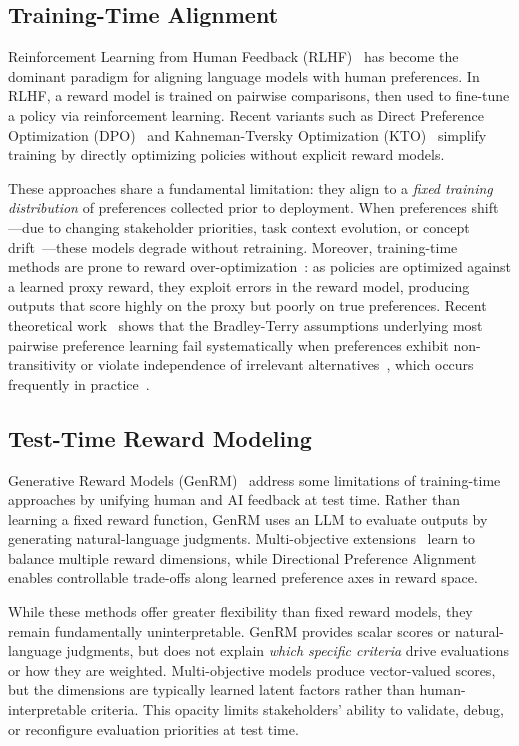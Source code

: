 \documentclass[sigconf]{acmart}
\begin{document}
\subsection{Training-Time Alignment}

Reinforcement Learning from Human Feedback (RLHF)~\cite{instructgpt2022,summarization_rlhf2020} has become the dominant paradigm for aligning language models with human preferences. In RLHF, a reward model is trained on pairwise comparisons, then used to fine-tune a policy via reinforcement learning. Recent variants such as Direct Preference Optimization (DPO)~\cite{TODO_dpo} and Kahneman-Tversky Optimization (KTO)~\cite{TODO_kto} simplify training by directly optimizing policies without explicit reward models.

These approaches share a fundamental limitation: they align to a \emph{fixed training distribution} of preferences collected prior to deployment. When preferences shift—due to changing stakeholder priorities, task context evolution, or concept drift~\cite{preference_drift2024}—these models degrade without retraining. Moreover, training-time methods are prone to reward over-optimization~\cite{goodhart2022}: as policies are optimized against a learned proxy reward, they exploit errors in the reward model, producing outputs that score highly on the proxy but poorly on true preferences. Recent theoretical work~\cite{bt_critique2024} shows that the Bradley-Terry assumptions underlying most pairwise preference learning fail systematically when preferences exhibit non-transitivity or violate independence of irrelevant alternatives~\cite{rlhf_iia2023}, which occurs frequently in practice~\cite{elspr2025,nontransitivity2025}.


\subsection{Test-Time Reward Modeling}

Generative Reward Models (GenRM)~\cite{genrm2024} address some limitations of training-time approaches by unifying human and AI feedback at test time. Rather than learning a fixed reward function, GenRM uses an LLM to evaluate outputs by generating natural-language judgments. Multi-objective extensions~\cite{armorm2024,multiobjective_grm2024} learn to balance multiple reward dimensions, while Directional Preference Alignment~\cite{dpa2024} enables controllable trade-offs along learned preference axes in reward space.

While these methods offer greater flexibility than fixed reward models, they remain fundamentally uninterpretable. GenRM provides scalar scores or natural-language judgments, but does not explain \emph{which specific criteria} drive evaluations or how they are weighted. Multi-objective models produce vector-valued scores, but the dimensions are typically learned latent factors rather than human-interpretable criteria. This opacity limits stakeholders' ability to validate, debug, or reconfigure evaluation priorities at test time.
\end{document}
